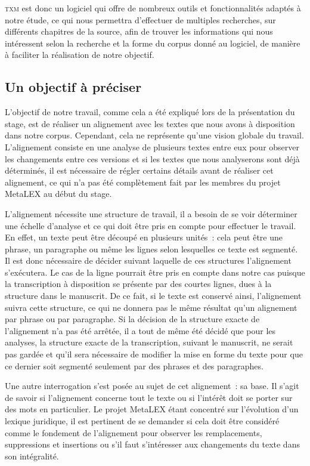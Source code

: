 \textsc{txm} est donc un logiciel qui offre de nombreux outils et fonctionnalités adaptés à notre étude, ce qui nous permettra d'effectuer de multiples recherches, sur différents chapitres de la source, afin de trouver les informations qui nous intéressent selon la recherche et la forme du corpus donné au logiciel, de manière à faciliter la réalisation de notre objectif.

\subsection{Un objectif à préciser}
L'objectif de notre travail, comme cela a été expliqué lors de la présentation du stage, est de réaliser un alignement avec les textes que nous avons à disposition dans notre corpus. Cependant, cela ne représente qu'une vision globale du travail. L'alignement consiste en une analyse de plusieurs textes entre eux pour observer les changements entre ces versions et si les textes que nous analyserons sont déjà déterminés, il est nécessaire de régler certains détails avant de réaliser cet alignement, ce qui n'a pas été complètement fait par les membres du projet MetaLEX au début du stage. 

L'alignement nécessite une structure de travail, il a besoin de se voir déterminer une échelle d'analyse et ce qui doit être pris en compte pour effectuer le travail. En effet, un texte peut être découpé en plusieurs unités~: cela peut être une phrase, un paragraphe ou même les lignes selon lesquelles ce texte est segmenté. Il est donc nécessaire de décider suivant laquelle de ces structures l'alignement s'exécutera. Le cas de la ligne pourrait être pris en compte dans notre cas puisque la transcription à disposition se présente par des courtes lignes, dues à la structure dans le manuscrit. De ce fait, si le texte est conservé ainsi, l'alignement suivra cette structure, ce qui ne donnera pas le même résultat qu'un alignement par phrase ou par paragraphe. Si la décision de la structure exacte de l'alignement n'a pas été arrêtée, il a tout de même été décidé que pour les analyses, la structure exacte de la transcription, suivant le manuscrit, ne serait pas gardée et qu'il sera nécessaire de modifier la mise en forme du texte pour que ce dernier soit segmenté seulement par des phrases et des paragraphes. 

Une autre interrogation s'est posée au sujet de cet alignement~: sa base. Il s'agit de savoir si l'alignement concerne tout le texte ou si l'intérêt doit se porter sur des mots en particulier. Le projet MetaLEX étant concentré sur l'évolution d'un lexique juridique, il est pertinent de se demander si cela doit être considéré comme le fondement de l'alignement pour observer les remplacements, suppressions et insertions ou s'il faut s'intéresser aux changements du texte dans son intégralité. 

